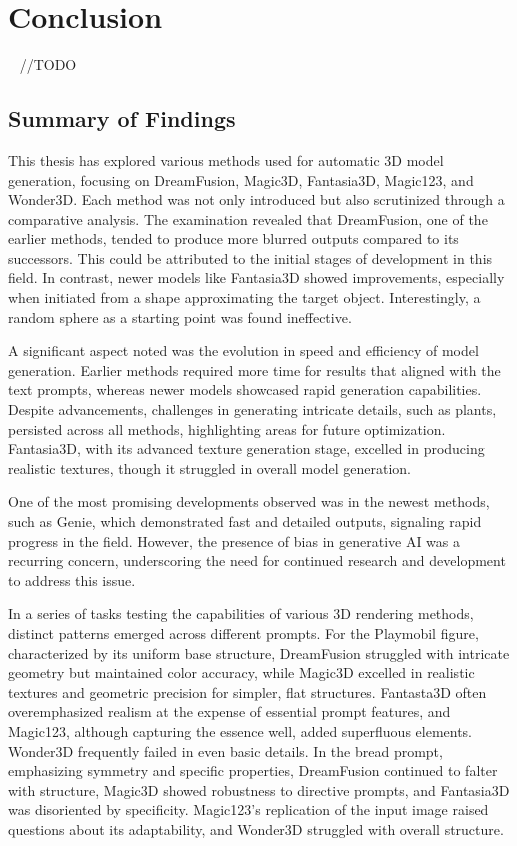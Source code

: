 \chapter{Conclusion}~\label{ch:conclusion}
//TODO

\section{Summary of Findings}

This thesis has explored various methods used for automatic 3D model generation, focusing on DreamFusion, Magic3D, Fantasia3D, Magic123, and Wonder3D. Each method was not only introduced but also scrutinized through a comparative analysis. The examination revealed that DreamFusion, one of the earlier methods, tended to produce more blurred outputs compared to its successors. This could be attributed to the initial stages of development in this field. In contrast, newer models like Fantasia3D showed improvements, especially when initiated from a shape approximating the target object. Interestingly, a random sphere as a starting point was found ineffective.

A significant aspect noted was the evolution in speed and efficiency of model generation. Earlier methods required more time for results that aligned with the text prompts, whereas newer models showcased rapid generation capabilities. Despite advancements, challenges in generating intricate details, such as plants, persisted across all methods, highlighting areas for future optimization. Fantasia3D, with its advanced texture generation stage, excelled in producing realistic textures, though it struggled in overall model generation.

One of the most promising developments observed was in the newest methods, such as Genie, which demonstrated fast and detailed outputs, signaling rapid progress in the field. However, the presence of bias in generative AI was a recurring concern, underscoring the need for continued research and development to address this issue.



In a series of tasks testing the capabilities of various 3D rendering methods, distinct patterns emerged across different prompts. For the Playmobil figure, characterized by its uniform base structure, DreamFusion struggled with intricate geometry but maintained color accuracy, while Magic3D excelled in realistic textures and geometric precision for simpler, flat structures. Fantasta3D often overemphasized realism at the expense of essential prompt features, and Magic123, although capturing the essence well, added superfluous elements. Wonder3D frequently failed in even basic details. In the bread prompt, emphasizing symmetry and specific properties, DreamFusion continued to falter with structure, Magic3D showed robustness to directive prompts, and Fantasia3D was disoriented by specificity. Magic123's replication of the input image raised questions about its adaptability, and Wonder3D struggled with overall structure.

